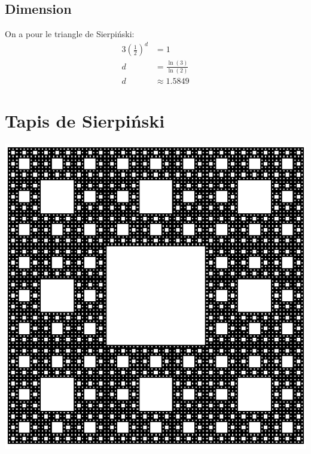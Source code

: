 \documentclass[a4paper, 12pt]{report}
\begin{document}
			\subsection{Dimension}
				On a pour le triangle de Sierpiński:
				\begin{align*}
					 3\left(\frac{1}{2}\right)^d	&=1\\
												d	&=\frac{\ln(3)}{\ln(2)}\\
												d	&\approx 1.5849
				\end{align*}	
\newpage
		\section{Tapis de Sierpiński}
			\begin{center}
				\includegraphics[scale=0.3]{Images/carpet}
			\end{center}
\end{document}
